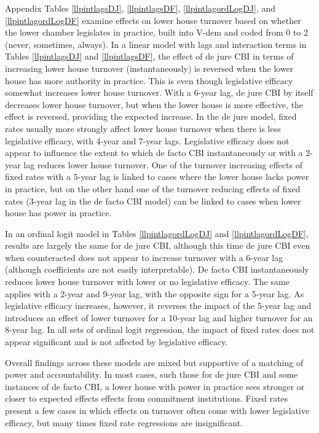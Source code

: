 \documentclass{article}
\begin{document}
    Appendix Tables \ref{llpintlagsDJ}, \ref{llpintlagsDF}, \ref{llpintlagordLogDJ}, and \ref{llpintlagordLogDF} examine effects on lower house turnover based on whether the lower chamber legislates in practice, built into V-dem and coded from 0 to 2 (never, sometimes, always). In a linear model with lags and interaction terms in Tables \ref{llpintlagsDJ} and \ref{llpintlagsDF}, the effect of de jure CBI in terms of increasing lower house turnover (instantaneously) is reversed when the lower house has more authority in practice. This is even though legislative efficacy somewhat increases lower house turnover. With a 6-year lag, de jure CBI by itself decreases lower house turnover, but when the lower house is more effective, the effect is reversed, providing the expected increase. In the de jure model, fixed rates usually more strongly affect lower house turnover when there is less legislative efficacy, with 4-year and 7-year lags. Legislative efficacy does not appear to influence the extent to which de facto CBI instantaneously or with a 2-year lag reduces lower house turnover. One of the turnover increasing effects of fixed rates with a 5-year lag is linked to cases where the lower house lacks power in practice, but on the other hand one of the turnover reducing effects of fixed rates (3-year lag in the de facto CBI model) can be linked to cases when lower house has power in practice.

    In an ordinal logit model in Tables \ref{llpintlagordLogDJ} and \ref{llpintlagordLogDF}, results are largely the same for de jure CBI, although this time de jure CBI even when counteracted does not appear to increase turnover with a 6-year lag (although coefficients are not easily interpretable). De facto CBI instantaneously reduces lower house turnover with lower or no legislative efficacy. The same applies with a 2-year and 9-year lag, with the opposite sign for a 5-year lag. As legislative efficacy increases, however, it reverses the impact of the 5-year lag and introduces an effect of lower turnover for a 10-year lag and higher turnover for an 8-year lag. In all sets of ordinal logit regression, the impact of fixed rates does not appear significant and is not affected by legislative efficacy.

    Overall findings across these models are mixed but supportive of a matching of power and accountability. In most cases, such those for de jure CBI and some instances of de facto CBI, a lower house with power in practice sees stronger or closer to expected effects effects from commitment institutions. Fixed rates present a few cases in which effects on turnover often come with lower legislative efficacy, but many times fixed rate regressions are insignificant.
    
\end{document}
